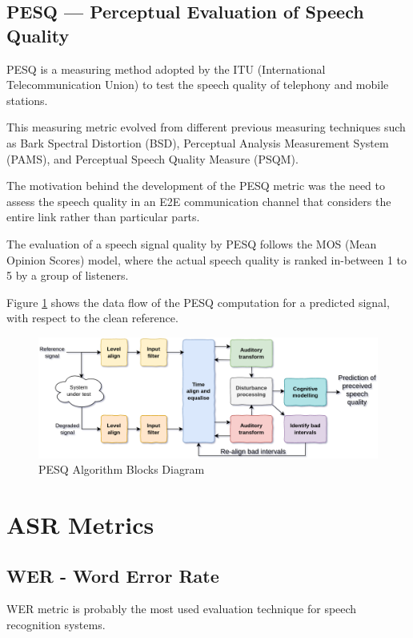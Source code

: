 \subsection{PESQ --- Perceptual Evaluation of Speech Quality}
PESQ\cite{941023} is a measuring method adopted by 
the ITU (International Telecommunication Union) to
test the speech quality of telephony and mobile stations.

This measuring metric evolved from different previous 
measuring techniques such as Bark Spectral Distortion (BSD),
Perceptual Analysis Measurement System (PAMS),
and Perceptual Speech Quality Measure (PSQM).

The motivation behind the development of the PESQ metric
was the need to assess the speech quality in an E2E
communication channel that considers 
the entire link rather than particular parts.

The evaluation of a speech signal quality by PESQ
follows the MOS (Mean Opinion Scores) model, where
the actual speech quality is ranked in-between 1 to 5 
by a group of listeners.

Figure \ref{fig:pesq_blocks_diagram} shows the data flow
of the PESQ computation for a predicted signal, with respect to the
clean reference.

\begin{figure}[H]
    \centering
    \includegraphics[width=0.85\linewidth]{Features/images/pesq_blocks_diagram_new}
    \caption{PESQ Algorithm Blocks Diagram}\label{fig:pesq_blocks_diagram}
\end{figure}

\section{ASR Metrics}
\subsection{WER - Word Error Rate}
WER\cite{KLAKOW200219} metric is probably the most used evaluation
technique for speech recognition systems.

